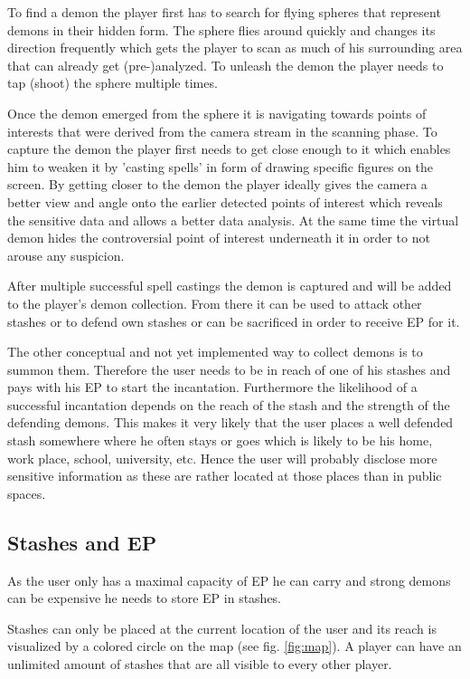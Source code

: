 To find a demon the player first has to search for flying spheres that represent demons in their hidden form. 
The sphere flies around quickly and changes its direction frequently which gets the player to scan as much of his surrounding area that can already get (pre-)analyzed.
To unleash the demon the player needs to tap (shoot) the sphere multiple times. 

Once the demon emerged from the sphere it is navigating towards points of interests that were derived from the camera stream in the scanning phase.
To capture the demon the player first needs to get close enough to it which enables him to weaken it by 'casting spells' in form of drawing specific figures on the screen. 
By getting closer to the demon the player ideally gives the camera a better view and angle onto the earlier detected points of interest which reveals the sensitive data and allows a better data analysis. 
At the same time the virtual demon hides the controversial point of interest underneath it in order to not arouse any suspicion. 

After multiple successful spell castings the demon is captured and will be added to the player's demon collection. 
From there it can be used to attack other stashes or to defend own stashes or can be sacrificed in order to receive EP for it.

The other conceptual and not yet implemented way to collect demons is to summon them. Therefore the user needs to be in reach of one of his stashes and pays with his EP to start the incantation. Furthermore the likelihood of a successful incantation depends on the reach of the stash and the strength of the defending demons. 
This makes it very likely that the user places a well defended stash somewhere where he often stays or goes which is likely to be his home, work place, school, university, etc.
Hence the user will probably disclose more sensitive information as these are rather located at those places than in public spaces.

\subsection{Stashes and EP}
\label{subsec:stashesandep}

As the user only has a maximal capacity of EP he can carry and strong demons can be expensive he needs to store EP in stashes.

Stashes can only be placed at the current location of the user and its reach is visualized by a colored circle on the map (see fig. \ref{fig:map}).
A player can have an unlimited amount of stashes that are all visible to every other player. 

